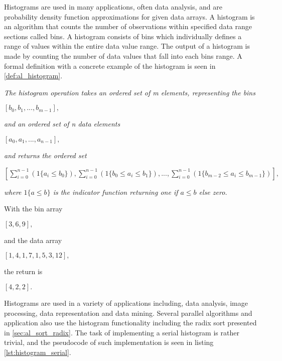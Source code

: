 Histograms are used in many applications, often data analysis, and are probability density function approximations for given data arrays. A histogram is an algorithm that counts the number of observations within specified data range sections called bins. A histogram consists of bins which individually defines a range of values within the entire data value range. The output of a histogram is made by counting the number of data values that fall into each bins range. A formal definition with a concrete example of the histogram is seen in \cref{def:al_histogram}.

\begin{definition}
	\label{def:al_histogram}
	\textit{The histogram operation takes an ordered set of m elements, representing the bins}
	\begin{center}
		$[b_0,b_1,...,b_{m-1}],$
	\end{center}
	\textit{and an ordered set of n data elements}
	\begin{center}
		$[a_0,a_1,...,a_{n-1}],$
	\end{center}
	\textit{and returns the ordered set}
	\begin{center}
		$[\sum_{i=0}^{n-1}(1\{ a_i \leq b_0 \}),\sum_{i=0}^{n-1}(1\{b_0 \leq a_i \leq b_1\}),...,\sum_{i=0}^{n-1}(1\{b_{m-2} \leq a_i \leq b_{m-1}\})],$
	\end{center}
	\textit{where $1\{a\leq b\}$ is the indicator function returning one if $a\leq b$ else zero.}
\end{definition}
\begin{example}
	With the bin array
		\begin{center}
		$[3,6,9],$
	\end{center}
	and the data array 
		\begin{center}
		$[1,4,1,7,1,5,3,12],$
	\end{center}
	the return is
		\begin{center}
		$[4,2,2].$
	\end{center}
\end{example}

Histograms are used in a variety of applications including, data analysis, image processing, data representation and data mining. Several parallel algorithms and application also use the histogram functionality including the radix sort presented in \cref{sec:al_sort_radix}. The task of implementing a serial histogram is rather trivial, and the pseudocode of such implementation is seen in listing \ref{lst:histogram_serial}.

